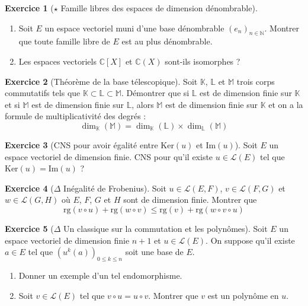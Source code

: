 \documentclass[french]{book}
\newcommand{\N}{\mathbb{N}}
\newcommand{\C}{\mathbb{C}}
\newcommand{\K}{\mathbb{K}}
\renewcommand{\L}{\mathbb{L}}
\renewcommand{\ker}{\text{Ker}}
\newcommand{\im}{\text{Im}}
\theoremstyle{definition}
\newtheorem{ex}{Exercice}[chapter]
\theoremstyle{theorem}
\theoremstyle{remark}
\begin{document}
\begin{ex}[$\star$ Famille libres des espaces de dimension dénombrable]
	\begin{enumerate}
		\item Soit $E$ un espace vectoriel muni d'une base dénombrable $(e_n)_{n\in\N}$. Montrer que toute famille libre de $E$ est au plus dénombrable.
		\item Les espaces vectoriels $\C[X]$ et $\C(X)$ sont-ils isomorphes ?
	\end{enumerate}
\end{ex}

\begin{ex}[Théorème de la base télescopique]
	Soit $\K$, $\L$ et $\mathbb{M}$ trois corps commutatifs tels que $\K\subset\L\subset\mathbb{M}$. Démontrer que si $\L$ est de dimension finie sur $\K$ et si $\mathbb{M}$ est de dimension finie sur $\L$, alors $\mathbb{M}$ est de dimension finie sur $\K$ et on a la formule de multiplicativité des degrés : $$\dim_\K(\mathbb{M})=\dim_\K(\L)\times\dim_\L(\mathbb{M})$$
\end{ex}

\begin{ex}[CNS pour avoir égalité entre $\ker(u)$ et $\im(u)$]
	Soit $E$ un espace vectoriel de dimension finie. CNS pour qu'il existe $u\in\mathcal{L}(E)$ tel que $\ker(u)=\im(u)$ ?
\end{ex}

\begin{ex}[$\Delta$ Inégalité de Frobenius]
	Soit $u\in\mathcal{L}(E,F)$, $v\in\mathcal{L}(F,G)$ et $w\in\mathcal{L}(G,H)$ où $E$, $F$, $G$ et $H$ sont de dimension finie. Montrer que $$\text{rg}(v\circ u)+\text{rg}(w\circ v)\leqslant\text{rg}(v)+\text{rg}(w\circ v\circ u)$$
\end{ex}

\begin{ex}[$\Delta$ Un classique sur la commutation et les polynômes]
	Soit $E$ un espace vectoriel de dimension finie $n+1$ et $u\in\mathcal{L}(E)$. On suppose qu'il existe $a\in E$ tel que $\left(u^k(a)\right)_{0\leqslant k\leqslant n}$ soit une base de $E$.
	\begin{enumerate}
		\item Donner un exemple d'un tel endomorphisme.
		\item Soit $v\in \mathcal{L}(E)$ tel que $v\circ u=u\circ v$. Montrer que $v$ est un polynôme en $u$.
	\end{enumerate}
\end{ex}
\end{document}
